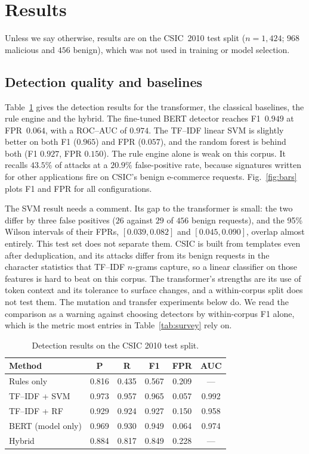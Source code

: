 \documentclass[preprint,11pt]{elsarticle}
\let\footnotesize\normalsize
\begin{document}
\section{Results}
\label{sec:results}
Unless we say otherwise, results are on the CSIC~2010 test split
($n=1{,}424$; $968$ malicious and $456$ benign), which was not used in
training or model selection.

\subsection{Detection quality and baselines}
Table~\ref{tab:main} gives the detection results for the transformer, the
classical baselines, the rule engine and the hybrid. The fine-tuned BERT
detector reaches F1~$0.949$ at FPR~$0.064$, with a ROC--AUC of $0.974$. The
TF--IDF linear SVM is slightly better on both F1 ($0.965$) and FPR
($0.057$), and the random forest is behind both (F1 $0.927$, FPR $0.150$).
The rule engine alone is weak on this corpus. It recalls $43.5\%$ of
attacks at a $20.9\%$ false-positive rate, because signatures written for
other applications fire on CSIC's benign e-commerce requests.
Fig.~\ref{fig:bars} plots F1 and FPR for all configurations.

The SVM result needs a comment. Its gap to the transformer is small: the
two differ by three false positives ($26$ against $29$ of $456$ benign
requests), and the 95\% Wilson intervals of their FPRs, $[0.039,0.082]$ and
$[0.045,0.090]$, overlap almost entirely. This test set does not separate
them. CSIC is built from templates even after deduplication, and its
attacks differ from its benign requests in the character statistics that
TF--IDF $n$-grams capture, so a linear classifier on those features is hard
to beat on this corpus. The transformer's strengths are its use of token
context and its tolerance to surface changes, and a within-corpus split
does not test them. The mutation and transfer experiments below do. We
read the comparison as a warning against choosing detectors by
within-corpus F1 alone, which is the metric most entries in
Table~\ref{tab:survey} rely on.

\begin{table}[t]
\centering
\footnotesize
\caption{Detection results on the CSIC 2010 test split.}
\label{tab:main}
\begin{tabular}{@{}lccccc@{}}
\toprule
Method & P & R & F1 & FPR & AUC \\
\midrule
Rules only  & 0.816 & 0.435 & 0.567 & 0.209 & --- \\
TF--IDF + SVM & 0.973 & 0.957 & 0.965 & 0.057 & 0.992 \\
TF--IDF + RF & 0.929 & 0.924 & 0.927 & 0.150 & 0.958 \\
BERT (model only)      & 0.969 & 0.930 & 0.949 & 0.064 & 0.974 \\
Hybrid      & 0.884 & 0.817 & 0.849 & 0.228 & --- \\
\bottomrule
\end{tabular}
\end{table}
\end{document}

